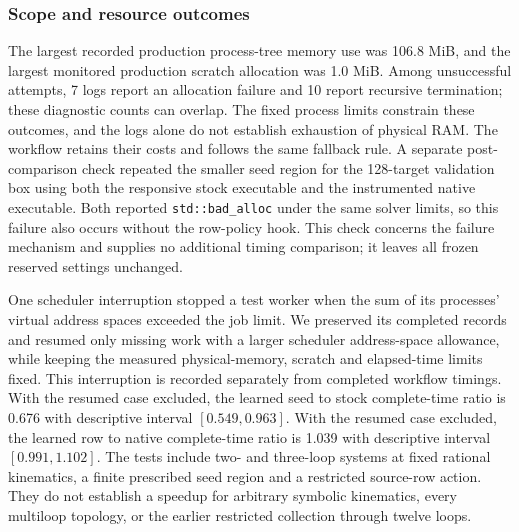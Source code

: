 \subsubsection{Scope and resource outcomes}
The largest recorded production process-tree memory use was 106.8 MiB, and the largest monitored production scratch allocation was 1.0 MiB. Among unsuccessful attempts, 7 logs report an allocation failure and 10 report recursive termination; these diagnostic counts can overlap. The fixed process limits constrain these outcomes, and the logs alone do not establish exhaustion of physical RAM. The workflow retains their costs and follows the same fallback rule. A separate post-comparison check repeated the smaller seed region for the 128-target validation box using both the responsive stock executable and the instrumented native executable. Both reported \texttt{std::bad\_alloc} under the same solver limits, so this failure also occurs without the row-policy hook. This check concerns the failure mechanism and supplies no additional timing comparison; it leaves all frozen reserved settings unchanged.

One scheduler interruption stopped a test worker when the sum of its processes' virtual address spaces exceeded the job limit. We preserved its completed records and resumed only missing work with a larger scheduler address-space allowance, while keeping the measured physical-memory, scratch and elapsed-time limits fixed. This interruption is recorded separately from completed workflow timings. With the resumed case excluded, the learned seed to stock complete-time ratio is 0.676 with descriptive interval $[0.549,0.963]$. With the resumed case excluded, the learned row to native complete-time ratio is 1.039 with descriptive interval $[0.991,1.102]$. The tests include two- and three-loop systems at fixed rational kinematics, a finite prescribed seed region and a restricted source-row action. They do not establish a speedup for arbitrary symbolic kinematics, every multiloop topology, or the earlier restricted collection through twelve loops.
\FloatBarrier
